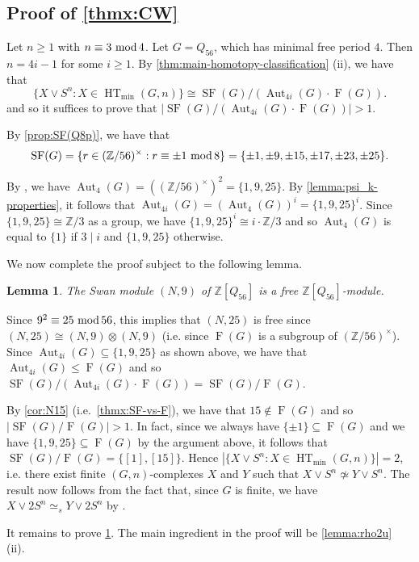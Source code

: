 \documentclass[11pt,leqno,a4paper]{amsart}
\newcommand{\Z}{\mathbb{Z}}
\renewcommand{\mod}{\,\,\text{\normalfont mod}\,}
\DeclareMathOperator{\Aut}{Aut}
\DeclareMathOperator{\SF}{SF}
\DeclareMathOperator{\HT}{HT}
\DeclareMathOperator{\FF}{F}
\newtheorem{lemma}[thm]{Lemma}
\theoremstyle{definition}
\theoremstyle{remark}
\theoremstyle{custom}
\begin{document}
\subsection{Proof of \cref{thmx:CW}} \label{ss:CW-proof}

Let $n \ge 1$ with $n \equiv 3 \mod 4$. Let $G = Q_{56}$, which has minimal free period $4$. Then $n=4i-1$ for some $i \ge 1$. By \cref{thm:main-homotopy-classification} (ii), we have that 
\[ \{X \vee S^n : X \in \HT_{\min}(G,n)\} \cong \SF(G)/ (\Aut_{4i}(G) \cdot \FF(G)).\]
and so it suffices to prove that $\lvert \SF(G)/ (\Aut_{4i}(G) \cdot \FF(G)) \rvert > 1$.

By \cref{prop:SF(Q8p)}, we have that 
\[ \SF(G) = \{r \in (\Z/56)^\times : r \equiv \pm 1 \mod 8\} = \{ \pm 1, \pm 9, \pm 15, \pm 17, \pm 23, \pm 25\}.\]

By \cite[Proposition 1.1]{GG04}, we have
$\Aut_4(G) = ((\Z/56)^\times)^2 = \{1,9,25\}$. By \cref{lemma:psi_k-properties}, it
follows that $\Aut_{4i}(G) = (\Aut_4(G))^i = \{1,9,25\}^i$. Since $\{1,9,25\} \cong \Z/3$ as a group, we have $\{1,9,25\}^i \cong i \cdot \Z/3$ and so $\Aut_4(G)$ is equal to $\{1\}$ if $3 \mid i$ and $\{1,9,25\}$ otherwise.

We now complete the proof subject to the following lemma.

\begin{lemma} \label{cor:N9}
The Swan module $(N, 9)$ of $\Z[Q_{56}]$ is a free $\Z[Q_{56}]$-module.
\end{lemma}

Since $9^2 \equiv 25 \mod 56$, this implies that $(N,25)$ is free since $(N,25) \cong (N,9) \otimes (N,9)$ (i.e. since $\FF(G)$ is a subgroup of $(\Z/56)^\times$). Since $\Aut_{4i}(G) \subseteq \{1,9,25\}$ as shown above, we have that $\Aut_{4i}(G) \le \FF(G)$ and so $\SF(G)/(\Aut_{4i}(G) \cdot \FF(G)) = \SF(G) /{\FF(G)}$.

By \cref{cor:N15} (i.e.~\cref{thmx:SF-vs-F}), we have that $15 \not \in \FF(G)$ and so $\lvert\SF(G)/\FF(G)\rvert > 1$. In fact, since we always have $\{\pm 1\} \subseteq \FF(G)$ and we have $\{1,9,25\} \subseteq \FF(G)$ by the argument above, it follows that $\SF(G)/{\FF(G)} = \{[1],[15]\}$.
Hence $|\{X \vee S^n : X \in \HT_{\min}(G,n)\}| =2$, i.e. there exist finite $(G,n)$-complexes $X$ and $Y$ such that $X \vee S^n \not \simeq Y \vee S^n$. 
The result now follows from the fact that, since $G$ is finite, we have $X \vee 2S^n \simeq_s Y \vee 2S^n$ by \cite[Theorem 3]{Dy81}.

It remains to prove \cref{cor:N9}. The main ingredient in the proof will be \cref{lemma:rho2u} (ii).
\end{document}
